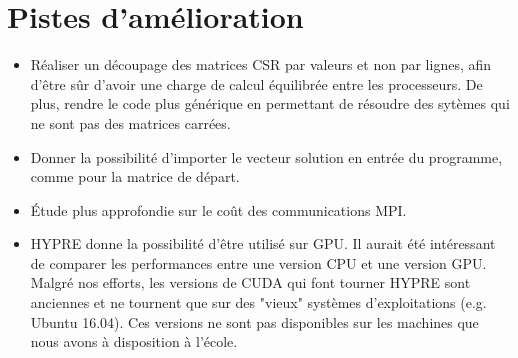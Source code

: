 \documentclass[10pt,twocolumn,letterpaper]{article}
\begin{document}
\section*{Pistes d'amélioration}

\begin{itemize}
  \item Réaliser un découpage des matrices CSR par valeurs et non
par lignes, afin d'être sûr d'avoir une charge de calcul équilibrée entre les
processeurs. De plus, rendre le code plus générique en permettant de résoudre
des sytèmes qui ne sont pas des matrices carrées.
  \item Donner la possibilité d'importer le vecteur solution en
entrée du programme, comme pour la matrice de départ.
  \item Étude plus approfondie sur le coût des communications MPI.
  \item HYPRE donne la possibilité d'être utilisé sur GPU. Il aurait été intéressant de
comparer les performances entre une version CPU et une version GPU. Malgré nos
efforts, les versions de CUDA qui font tourner HYPRE sont anciennes
et ne tournent que sur des "vieux" systèmes d'exploitations (e.g. Ubuntu 16.04).
Ces versions ne sont pas disponibles sur les machines que nous avons à
disposition à l'école.
\end{itemize}


\end{document}
